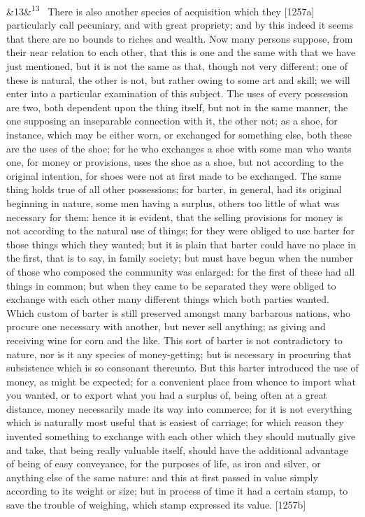 \documentclass[12pt]{article}
\newcommand{\para}[1][]{\par\noindent\ifx&#1&\else\textsuperscript{\footnotesize #1}~\fi}
\begin{document}
\para[13] There is also another species of acquisition which they [1257a] particularly call pecuniary, and with great propriety; and by this indeed it seems that there are no bounds to riches and wealth. Now many persons suppose, from their near relation to each other, that this is one and the same with that we have just mentioned, but it is not the same as that, though not very different; one of these is natural, the other is not, but rather owing to some art and skill; we will enter into a particular examination of this subject. The uses of every possession are two, both dependent upon the thing itself, but not in the same manner, the one supposing an inseparable connection with it, the other not; as a shoe, for instance, which may be either worn, or exchanged for something else, both these are the uses of the shoe; for he who exchanges a shoe with some man who wants one, for money or provisions, uses the shoe as a shoe, but not according to the original intention, for shoes were not at first made to be exchanged. The same thing holds true of all other possessions; for barter, in general, had its original beginning in nature, some men having a surplus, others too little of what was necessary for them: hence it is evident, that the selling provisions for money is not according to the natural use of things; for they were obliged to use barter for those things which they wanted; but it is plain that barter could have no place in the first, that is to say, in family society; but must have begun when the number of those who composed the community was enlarged: for the first of these had all things in common; but when they came to be separated they were obliged to exchange with each other many different things which both parties wanted. Which custom of barter is still preserved amongst many barbarous nations, who procure one necessary with another, but never sell anything; as giving and receiving wine for corn and the like. This sort of barter is not contradictory to nature, nor is it any species of money-getting; but is necessary in procuring that subsistence which is so consonant thereunto. But this barter introduced the use of money, as might be expected; for a convenient place from whence to import what you wanted, or to export what you had a surplus of, being often at a great distance, money necessarily made its way into commerce; for it is not everything which is naturally most useful that is easiest of carriage; for which reason they invented something to exchange with each other which they should mutually give and take, that being really valuable itself, should have the additional advantage of being of easy conveyance, for the purposes of life, as iron and silver, or anything else of the same nature: and this at first passed in value simply according to its weight or size; but in process of time it had a certain stamp, to save the trouble of weighing, which stamp expressed its value. [1257b]
\end{document}
